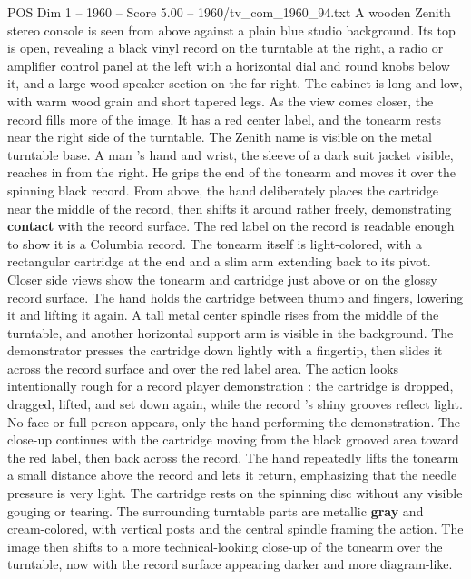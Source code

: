 \begin{textsample}{POS Dim 1 – 1960 – Score 5.00 – 1960/tv\_com\_1960\_94.txt}  \label{ex:f1_pos_074}
A wooden Zenith stereo console is seen from above against a plain blue studio background.
Its top is open, revealing a black vinyl record on the turntable at the right, a radio or amplifier control panel at the left with a horizontal dial and round knobs below it, and a large wood speaker section on the far right.
The cabinet is long and low, with warm wood grain and short tapered legs.
As the view comes closer, the record fills more of the image.
It has a red center label, and the tonearm rests near the right side of the turntable.
The Zenith name is visible on the metal turntable base.
A man ’s hand and wrist, the sleeve of a dark suit jacket visible, reaches in from the right.
He grips the end of the tonearm and moves it over the spinning black record.
From above, the hand deliberately places the cartridge near the middle of the record, then shifts it around rather freely, demonstrating \textbf{contact} with the record surface.
The red label on the record is readable enough to show it is a Columbia record.
The tonearm itself is light-colored, with a rectangular cartridge at the end and a slim arm extending back to its pivot.
Closer side views show the tonearm and cartridge just above or on the glossy record surface.
The hand holds the cartridge between thumb and fingers, lowering it and lifting it again.
A tall metal center spindle rises from the middle of the turntable, and another horizontal support arm is visible in the background.
The demonstrator presses the cartridge down lightly with a fingertip, then slides it across the record surface and over the red label area.
The action looks intentionally rough for a record player demonstration : the cartridge is dropped, dragged, lifted, and set down again, while the record ’s shiny grooves reflect light.
No face or full person appears, only the hand performing the demonstration.
The close-up continues with the cartridge moving from the black grooved area toward the red label, then back across the record.
The hand repeatedly lifts the tonearm a small distance above the record and lets it return, emphasizing that the needle pressure is very light.
The cartridge rests on the spinning disc without any visible gouging or tearing.
The surrounding turntable parts are metallic \textbf{gray} and cream-colored, with vertical posts and the central spindle framing the action.
The image then shifts to a more technical-looking close-up of the tonearm over the turntable, now with the record surface appearing darker and more diagram-like.

\end{textsample}

